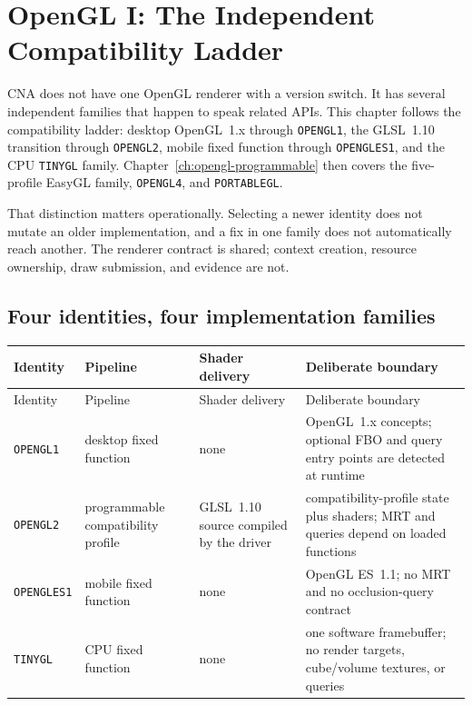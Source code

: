 \chapter[OpenGL I: The Independent Compatibility Ladder]{OpenGL I: The Independent\\Compatibility Ladder}
\label{ch:opengl-fixed-profiles}

CNA does not have one OpenGL renderer with a version switch.  It has several independent
families that happen to speak related APIs.  This chapter follows the compatibility ladder:
desktop OpenGL~1.x through \texttt{OPENGL1}, the GLSL~1.10 transition through
\texttt{OPENGL2}, mobile fixed function through \texttt{OPENGLES1}, and the CPU
\texttt{TINYGL} family. Chapter~\ref{ch:opengl-programmable}
then covers the five-profile EasyGL family, \texttt{OPENGL4}, and \texttt{PORTABLEGL}.

That distinction matters operationally.  Selecting a newer identity does not mutate an older
implementation, and a fix in one family does not automatically reach another.  The renderer
contract is shared; context creation, resource ownership, draw submission, and evidence are
not.

\section{Four identities, four implementation families}

\begin{longtable}{p{}p{}p{}p{}}
\toprule
Identity & Pipeline & Shader delivery & Deliberate boundary \\
\midrule
\endfirsthead
\toprule
Identity & Pipeline & Shader delivery & Deliberate boundary \\
\midrule
\endhead
\texttt{OPENGL1} & desktop fixed function & none & OpenGL~1.x concepts; optional FBO and query entry points are detected at runtime \\
\texttt{OPENGL2} & programmable compatibility profile & GLSL~1.10 source compiled by the driver & compatibility-profile state plus shaders; MRT and queries depend on loaded functions \\
\texttt{OPENGLES1} & mobile fixed function & none & OpenGL ES~1.1; no MRT and no occlusion-query contract \\
\texttt{TINYGL} & CPU fixed function & none & one software framebuffer; no render targets, cube/volume textures, or queries \\
\bottomrule
\end{longtable}

